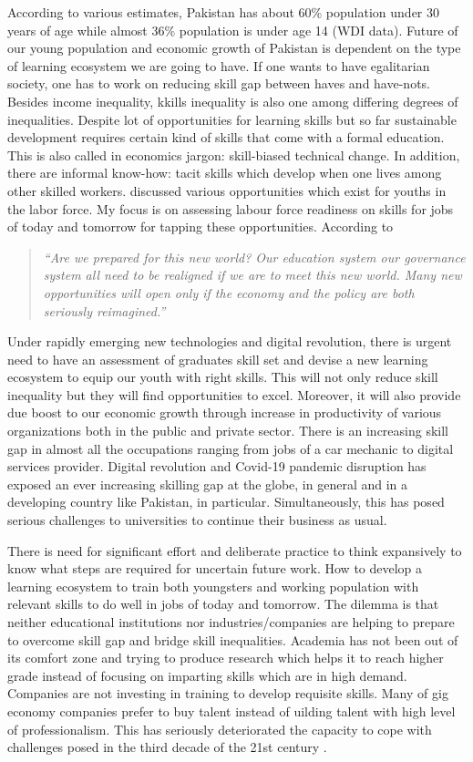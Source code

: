 \documentclass[
  12pt]{article}
\begin{document}
According to various estimates, Pakistan has about 60\% population under
30 years of age while almost 36\% population is under age 14 (WDI data).
Future of our young population and economic growth of Pakistan is
dependent on the type of learning ecosystem we are going to have. If one
wants to have egalitarian society, one has to work on reducing skill gap
between haves and have-nots. Besides income inequality, kkills
inequality is also one among differing degrees of inequalities. Despite
lot of opportunities for learning skills but so far sustainable
development requires certain kind of skills that come with a formal
education. This is also called in economics jargon: skill-biased
technical change. In addition, there are informal know-how: tacit skills
which develop when one lives among other skilled workers.
\citet{Haque2022} discussed various opportunities which exist for youths
in the labor force. My focus is on assessing labour force readiness on
skills for jobs of today and tomorrow for tapping these opportunities.
According to \citet{Haque2022}

\begin{quote}
\emph{``Are we prepared for this new world? Our education system our
governance system all need to be realigned if we are to meet this new
world. Many new opportunities will open only if the economy and the
policy are both seriously reimagined.''}
\end{quote}

Under rapidly emerging new technologies and digital revolution, there is
urgent need to have an assessment of graduates skill set and devise a
new learning ecosystem to equip our youth with right skills. This will
not only reduce skill inequality but they will find opportunities to
excel. Moreover, it will also provide due boost to our economic growth
through increase in productivity of various organizations both in the
public and private sector. There is an increasing skill gap in almost
all the occupations ranging from jobs of a car mechanic to digital
services provider. Digital revolution and Covid-19 pandemic disruption
has exposed an ever increasing skilling gap at the globe, in general and
in a developing country like Pakistan, in particular. Simultaneously,
this has posed serious challenges to universities to continue their
business as usual.

There is need for significant effort and deliberate practice to think
expansively to know what steps are required for uncertain future work.
How to develop a learning ecosystem to train both youngsters and working
population with relevant skills to do well in jobs of today and
tomorrow. The dilemma is that neither educational institutions nor
industries/companies are helping to prepare to overcome skill gap and
bridge skill inequalities. Academia has not been out of its comfort zone
and trying to produce research which helps it to reach higher grade
instead of focusing on imparting skills which are in high demand.
Companies are not investing in training to develop requisite skills.
Many of gig economy companies prefer to buy talent instead of uilding
talent with high level of professionalism. This has seriously
deteriorated the capacity to cope with challenges posed in the third
decade of the 21st century \citet{Weise2020}.
\end{document}
